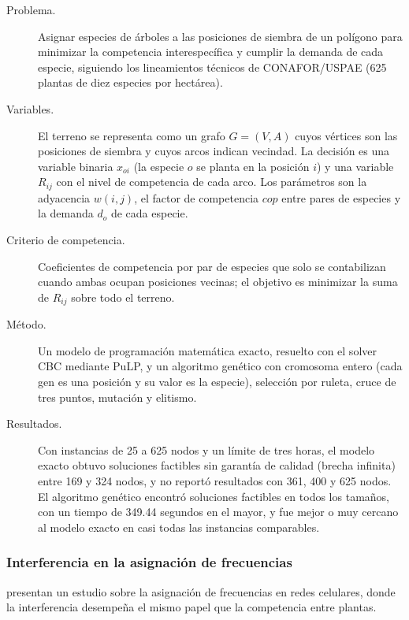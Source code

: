 \documentclass[11pt]{article}
\begin{document}
\begin{description}
  \item[Problema.] Asignar especies de árboles a las posiciones de siembra de un polígono para minimizar la competencia interespecífica y cumplir la demanda de cada especie, siguiendo los lineamientos técnicos de CONAFOR/USPAE (625 plantas de diez especies por hectárea).
  \item[Variables.] El terreno se representa como un grafo $G=(V,A)$ cuyos vértices son las posiciones de siembra y cuyos arcos indican vecindad. La decisión es una variable binaria $x_{oi}$ (la especie $o$ se planta en la posición $i$) y una variable $R_{ij}$ con el nivel de competencia de cada arco. Los parámetros son la adyacencia $w(i,j)$, el factor de competencia $cop$ entre pares de especies y la demanda $d_o$ de cada especie.
  \item[Criterio de competencia.] Coeficientes de competencia por par de especies que solo se contabilizan cuando ambas ocupan posiciones vecinas; el objetivo es minimizar la suma de $R_{ij}$ sobre todo el terreno.
  \item[Método.] Un modelo de programación matemática exacto, resuelto con el solver CBC mediante PuLP, y un algoritmo genético con cromosoma entero (cada gen es una posición y su valor es la especie), selección por ruleta, cruce de tres puntos, mutación y elitismo.
  \item[Resultados.] Con instancias de 25 a 625 nodos y un límite de tres horas, el modelo exacto obtuvo soluciones factibles sin garantía de calidad (brecha infinita) entre 169 y 324 nodos, y no reportó resultados con 361, 400 y 625 nodos. El algoritmo genético encontró soluciones factibles en todos los tamaños, con un tiempo de 349.44 segundos en el mayor, y fue mejor o muy cercano al modelo exacto en casi todas las instancias comparables.
\end{description}

\subsubsection{Interferencia en la asignación de frecuencias}

\textcite{eisenblatter2002} presentan un estudio sobre la asignación de frecuencias en redes celulares, donde la interferencia desempeña el mismo papel que la competencia entre plantas.
\end{document}
